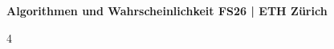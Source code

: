 \documentclass[8pt,landscape]{extarticle}
\begin{document}
{\large \textbf{Algorithmen und Wahrscheinlichkeit \hfill FS26 | ETH Zürich}}

\begin{multicols*}{4}

	
	
	
	
	
	
	
	\vfill\null
\end{multicols*}
\end{document}
